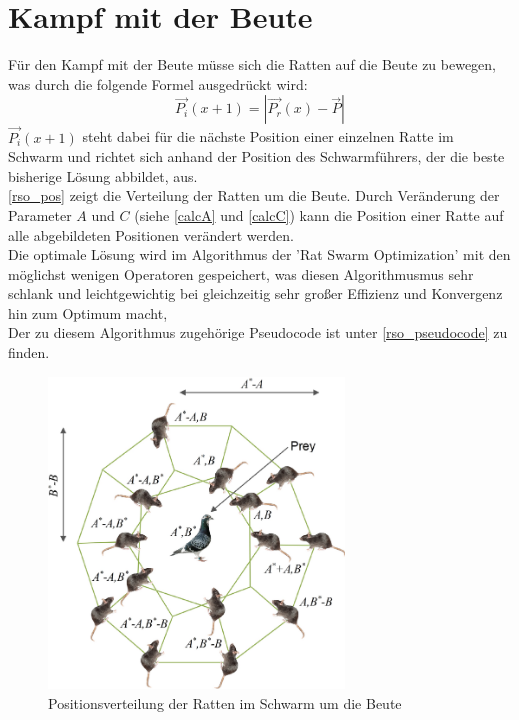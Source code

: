 \section{Kampf mit der Beute}
Für den Kampf mit der Beute müsse sich die Ratten auf die Beute zu bewegen, was durch die folgende Formel ausgedrückt wird: 
\begin{equation}
    \vec{P_i}(x+1) = |\vec{P_r}(x) - \vec{P}|
    \label{calcPNext}
\end{equation}
$\vec{P_i}(x+1)$ steht dabei für die nächste Position einer einzelnen Ratte im Schwarm und richtet sich anhand der Position des Schwarmführers, der die beste bisherige Lösung abbildet, aus.\\
\autoref{rso_pos} zeigt die Verteilung der Ratten um die Beute. Durch Veränderung der Parameter $A$ und $C$ (siehe \autoref{calcA} und \autoref{calcC}) kann die Position einer Ratte auf alle abgebildeten Positionen verändert werden. \\ 
Die optimale Lösung wird im Algorithmus der 'Rat Swarm Optimization' mit den möglichst wenigen Operatoren gespeichert, was diesen Algorithmusmus sehr schlank und leichtgewichtig bei gleichzeitig sehr großer Effizienz und Konvergenz hin zum Optimum macht, \cite[vgl. Gaurav Dhiman, S.4]{dhiman_garg_nagar_kumar_dehghani_2020}\\
Der zu diesem Algorithmus zugehörige Pseudocode ist unter \autoref{rso_pseudocode} zu finden.
\begin{figure}[ht]
    \begin{center}
        \includegraphics[width=0.7\textwidth]{assets/img/12652_2020_2580_Fig1_HTML.png}
        \caption[Positionsverteilung der Ratten im Schwarm um die Beute]{Positionsverteilung der Ratten im Schwarm um die Beute \cite{dhiman_garg_nagar_kumar_dehghani_2020}}
        \label{rso_pos}
    \end{center}
\end{figure}

